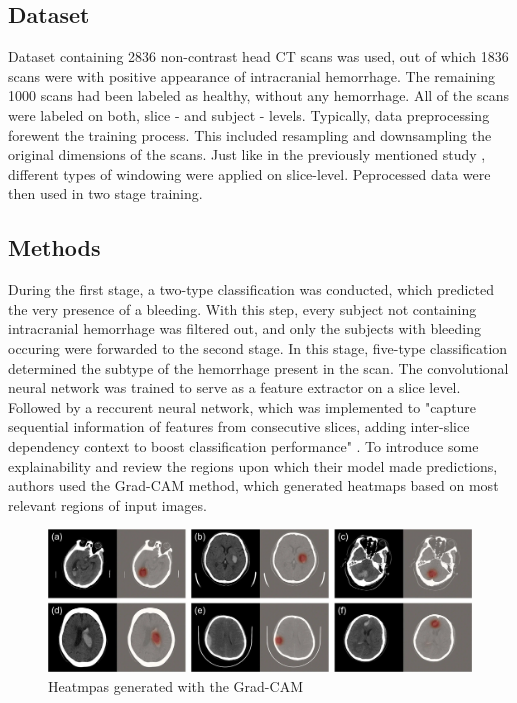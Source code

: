 \subsection*{Dataset}
Dataset containing 2836 non-contrast head CT scans was used, out of which 1836 scans were with positive appearance of intracranial hemorrhage. The remaining 1000 scans had been labeled as healthy, without any hemorrhage. All of the scans were labeled on both, slice - and subject - levels. Typically, data preprocessing forewent the training process. This included resampling and downsampling the original dimensions of the scans. Just like in the previously mentioned study \cite{relatedWork1}, different types of windowing were applied on slice-level. Peprocessed data were then used in two stage training. 
\subsection*{Methods}
During the first stage, a two-type classification was conducted, which predicted the very presence of a bleeding. With this step, every subject not containing intracranial hemorrhage was filtered out, and only the subjects with bleeding occuring were forwarded to the second stage. In this stage, five-type classification determined the subtype of the hemorrhage present in the scan. The convolutional neural network was trained to serve as a feature extractor on a slice level. Followed by a reccurent neural network, which was implemented to "capture sequential information of features from consecutive slices, adding inter-slice dependency context to boost classification performance" \cite{relatedWork2}. To introduce some explainability and review the regions upon which their model made predictions, authors used the Grad-CAM method, which generated heatmaps based on most relevant regions of input images.
\begin{figure}[!ht]
\begin{centering}
\includegraphics[width=15cm]{assets/images/RW2.jpg}
\par\end{centering}
\caption{Heatmpas generated with the Grad-CAM  \label{fig:rw2}}
\end{figure}

\section{}